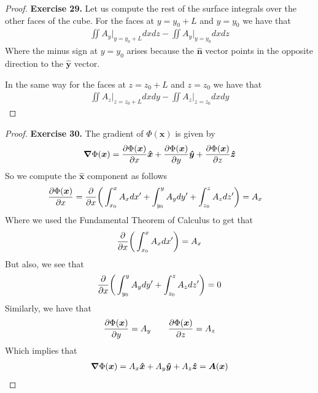 \documentclass[11pt]{article}
\newcommand{\hatx}{\bm{\hat{x}}}
\newcommand{\haty}{\bm{\hat{y}}}
\newcommand{\hatz}{\bm{\hat{z}}}
\newcommand{\hatn}{\bm{\hat{n}}}
\theoremstyle{definition}
\begin{document}
\begin{proof}{\textbf{Exercise 29.}}
    Let us compute the rest of the surface integrals over the other faces
    of the cube. For the faces at $y = y_0 + L$ and $y = y_0$ we have that
    \begin{align*}
        \iint A_y \bigg|_{y= y_0 + L} dxdz - \iint A_y \bigg|_{y= y_0} dxdz
    \end{align*}
    Where the minus sign at $y = y_0$ arises because the $\hatn$ vector points
    in the opposite direction to the $\haty$ vector.

    In the same way for the faces at $z = z_0 + L$ and $z = z_0$ we have that
    \begin{align*}
        \iint A_z \bigg|_{z= z_0 + L} dxdy - \iint A_z \bigg|_{z= z_0} dxdy
    \end{align*}
\end{proof}
\cleardoublepage
\begin{proof}{\textbf{Exercise 30.}}
    The gradient of $\Phi(\bm{x})$ is given by
    \begin{align*}
        \gradient \Phi(\bm{x}) = \partialderivative{\Phi(\bm{x})}{x}\hatx
        + \partialderivative{\Phi(\bm{x})}{y}\haty
        + \partialderivative{\Phi(\bm{x})}{z}\hatz
    \end{align*}
    So we compute the $\hatx$ component as follows
    \begin{align*}
        \partialderivative{\Phi(\bm{x})}{x}
        &= \partialderivative{}{x}\bigg(
            \int_{x_0}^x A_x dx' + \int_{y_0}^y A_y dy' + \int_{z_0}^z A_z dz'
        \bigg) = A_x
    \end{align*}
    Where we used the Fundamental Theorem of Calculus to get that
    \begin{align*}
        \partialderivative{}{x}\bigg( \int_{x_0}^x A_x dx' \bigg) = A_x
    \end{align*}
    But also, we see that
    \begin{align*}
        \partialderivative{}{x}\bigg(
            \int_{y_0}^y A_y dy' + \int_{z_0}^z A_z dz'
        \bigg) = 0
    \end{align*}
    Similarly, we have that
    \begin{align*}
        \partialderivative{\Phi(\bm{x})}{y} = A_y\qquad
        \partialderivative{\Phi(\bm{x})}{z} = A_z
    \end{align*}
    Which implies that 
    \begin{align*}
        \gradient \Phi(\bm{x}) = A_x \hatx + A_y \haty + A_z \hatz
        = \bm{A}(\bm{x})
    \end{align*}


\end{proof}
\end{document}
